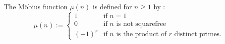 The Möbius function $\mu(n)$ is defined for $n\geq 1$ by :
\[\mu(n) := \begin{cases}1 & \text{if $n=1$} \\
0 & \text{if $n$ is not squarefree} \\
(-1)^r & \text{if $n$ is the product of $r$ distinct primes.}
\end{cases}\]





